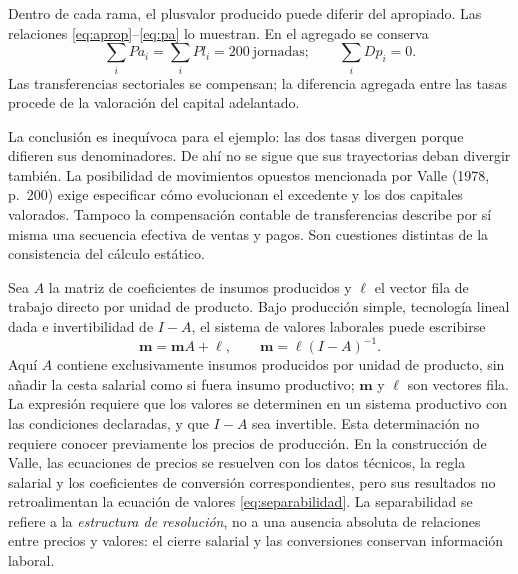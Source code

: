 \documentclass[10pt,twoside]{article}
\begin{document}
Dentro de cada rama, el plusvalor producido puede diferir del apropiado. Las relaciones \eqref{eq:aprop}--\eqref{eq:pa} lo muestran. En el agregado se conserva
\begin{equation}
\sum_i Pa_i=\sum_i Pl_i=200\ \text{jornadas};\qquad
\sum_i Dp_i=0.\label{eq:sumval}
\end{equation}
Las transferencias sectoriales se compensan; la diferencia agregada entre las tasas procede de la valoración del capital adelantado.

La conclusión es inequívoca para el ejemplo: las dos tasas divergen porque difieren sus denominadores. De ahí no se sigue que sus trayectorias deban divergir también. La posibilidad de movimientos opuestos mencionada por Valle (1978, p.~200) exige especificar cómo evolucionan el excedente y los dos capitales valorados. Tampoco la compensación contable de transferencias describe por sí misma una secuencia efectiva de ventas y pagos. Son cuestiones distintas de la consistencia del cálculo estático.

Sea $A$ la matriz de coeficientes de insumos producidos y $\boldsymbol\ell$ el vector fila de trabajo directo por unidad de producto. Bajo producción simple, tecnología lineal dada e invertibilidad de $I-A$, el sistema de valores laborales puede escribirse
\begin{equation}
\mathbf m=\mathbf m A+\boldsymbol\ell,
\qquad
\mathbf m=\boldsymbol\ell(I-A)^{-1}.
\label{eq:separabilidad}
\end{equation}
Aquí $A$ contiene exclusivamente insumos producidos por unidad de producto, sin añadir la cesta salarial como si fuera insumo productivo; $\mathbf m$ y $\boldsymbol\ell$ son vectores fila. La expresión requiere que los valores se determinen en un sistema productivo con las condiciones declaradas, y que $I-A$ sea invertible. Esta determinación no requiere conocer previamente los precios de producción. En la construcción de Valle, las ecuaciones de precios se resuelven con los datos técnicos, la regla salarial y los coeficientes de conversión correspondientes, pero sus resultados no retroalimentan la ecuación de valores \eqref{eq:separabilidad}. La separabilidad se refiere a la \emph{estructura de resolución}, no a una ausencia absoluta de relaciones entre precios y valores: el cierre salarial y las conversiones conservan información laboral.
\end{document}

